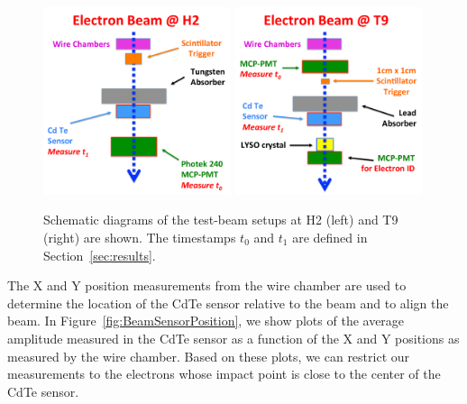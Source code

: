 \documentclass[preprint,1p]{elsarticle}
\begin{document}
\begin{figure}[htbp] 
\centering
\includegraphics[width=0.49\textwidth]{figures/H2_BeamSchematicDiagram.pdf} 
\includegraphics[width=0.49\textwidth]{figures/T9_BeamSchematicDiagram.pdf} 
\caption{Schematic diagrams of the test-beam setups at H2 (left) and T9 (right) are shown. 
The timestamps $t_0$ and $t_1$ are defined in Section~\ref{sec:results}.} 
\label{fig:BeamSchematicDiagram} 
\end{figure} 


The X and Y position measurements from the wire chamber are used to determine the location
of the CdTe sensor relative to the beam and to align the beam. In 
Figure~\ref{fig:BeamSensorPosition}, we show plots of the average amplitude measured in the
CdTe sensor as a function of the X and Y positions as measured by the wire chamber. Based
on these plots, we can restrict our measurements to the electrons whose impact point is close
to the center of the CdTe sensor.
\end{document}
